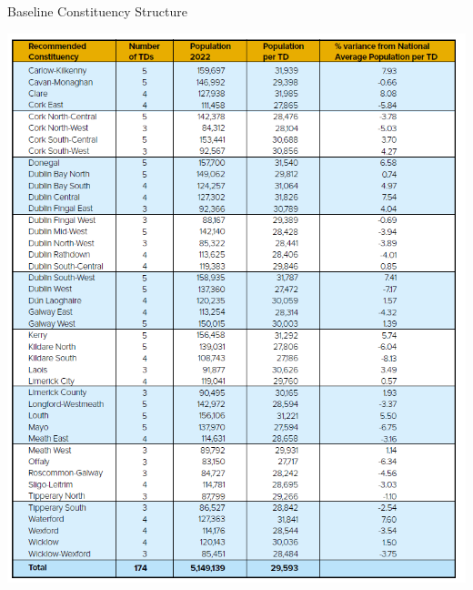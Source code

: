 \documentclass[runningheads]{llncs}
\begin{document}
\begin{table}[htbp]
\caption{\label{tab:baselinetable}Baseline Constituency Structure}
\includegraphics[width=\textwidth]{images/baselinetable}
\end{table}
\end{document}
